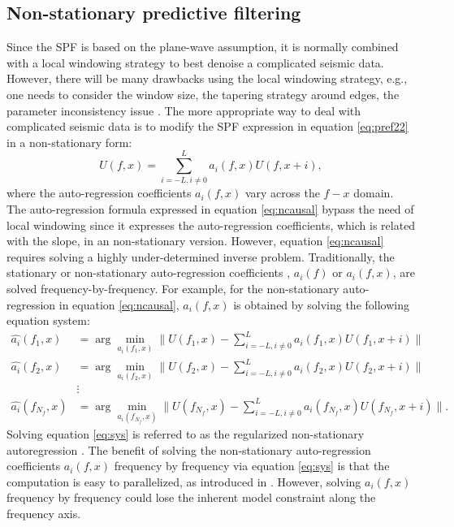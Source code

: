 \subsection{Non-stationary predictive filtering}
Since the SPF is based on the plane-wave assumption, it is normally combined with a local windowing strategy to best denoise a complicated seismic data. However, there will be many drawbacks using the local windowing strategy, e.g., one needs to consider the window size, the tapering strategy around edges, the parameter inconsistency issue \cite[]{shaohuan2017gji}. The more appropriate way to deal with complicated seismic data is to modify the SPF expression in equation \ref{eq:pref22} in a non-stationary form:
\begin{equation}
\label{eq:ncausal}
U(f,x)=\sum_{i=-L,i\ne 0}^{L}a_i(f,x)U(f,x+i),
\end{equation}
where the auto-regression coefficients $a_i(f,x)$ vary across the $f-x$ domain. The auto-regression formula expressed in equation \ref{eq:ncausal} bypass the need of local windowing since it expresses the auto-regression coefficients, which is related with the slope, in an non-stationary version. However, equation \ref{eq:ncausal} requires solving a highly under-determined inverse problem. Traditionally, the stationary \cite[]{canales1984} or non-stationary auto-regression coefficients \cite[]{guochang2012}, $a_i(f)$ or $a_i(f,x)$, are solved frequency-by-frequency. For example, for the non-stationary auto-regression in equation \ref{eq:ncausal}, $a_i(f,x)$ is obtained by solving the following equation system:
\begin{equation}
\label{eq:sys}
\begin{split}
\hat{a_i}(f_1,x) &= \arg \min_{a_i(f_1,x)} \parallel U(f_1,x)-\sum_{i=-L,i\ne 0}^{L}a_i(f_1,x)U(f_1,x+i) \parallel  \\
\hat{a_i}(f_2,x) &= \arg \min_{a_i(f_2,x)} \parallel U(f_2,x)-\sum_{i=-L,i\ne 0}^{L}a_i(f_2,x)U(f_2,x+i) \parallel  \\
&\vdots\\
\hat{a_i}(f_{N_f},x) &= \arg \min_{a_i(f_{N_f},x)} \parallel U(f_{N_f},x)-\sum_{i=-L,i\ne 0}^{L}a_i(f_{N_f},x)U(f_{N_f},x+i) \parallel.
\end{split}
\end{equation}
Solving equation \ref{eq:sys} is referred to as the regularized non-stationary autoregression \cite[]{guochang2012}. The benefit of solving the non-stationary auto-regression coefficients $a_i(f,x)$ frequency by frequency via equation \ref{eq:sys} is that the computation is easy to parallelized, as introduced in \cite{guochang2012}. However, solving $a_i(f,x)$ frequency by frequency could lose the inherent model constraint along the frequency axis. 

